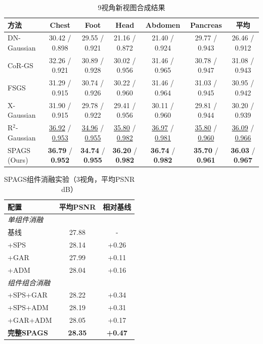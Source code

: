 \begin{table}[htbp]
    \centering
    \caption{9视角新视图合成结果}
    \label{tab:spags_9view}
    \footnotesize
    \begin{tabular*}{\textwidth}{@{\extracolsep{\fill}}lcccccc@{}}
        \toprule
        方法 & Chest & Foot & Head & Abdomen & Pancreas & 平均 \\
        \midrule
        DN-Gaussian & 30.42 / 0.898 & 29.55 / 0.921 & 21.16 / 0.872 & 21.40 / 0.924 & 29.77 / 0.943 & 26.46 / 0.912 \\
        CoR-GS & 32.26 / 0.921 & 30.89 / 0.928 & 30.02 / 0.956 & 31.46 / 0.965 & 30.78 / 0.947 & 31.08 / 0.943 \\
        FSGS & 31.29 / 0.915 & 30.74 / 0.926 & 30.22 / 0.960 & 31.46 / 0.964 & 31.03 / 0.945 & 30.95 / 0.942 \\
        X-Gaussian & 31.90 / 0.915 & 29.78 / 0.922 & 29.41 / 0.956 & 30.11 / 0.960 & 29.81 / 0.944 & 30.20 / 0.939 \\
        R$^2$-Gaussian & \underline{36.92} / \underline{0.953} & \underline{34.96} / \underline{0.955} & \underline{35.80} / \underline{0.982} & \underline{36.97} / \underline{0.981} & \underline{35.80} / \underline{0.960} & \underline{36.09} / \underline{0.966} \\
        SPAGS (Ours) & \textbf{36.79} / \textbf{0.952} & \textbf{34.74} / \textbf{0.955} & \textbf{36.20} / \textbf{0.982} & \textbf{36.74} / \textbf{0.982} & \textbf{35.70} / \textbf{0.961} & \textbf{36.03} / \textbf{0.967} \\
        \bottomrule
    \end{tabular*}
\end{table}

\begin{table}[htbp]
    \centering
    \caption{SPAGS组件消融实验（3视角，平均PSNR dB）}
    \label{tab:spags_ablation}
    \begin{tabular}{lcc}
        \toprule
        配置 & 平均PSNR & 相对基线 \\
        \midrule
        \multicolumn{3}{l}{\textit{单组件消融}} \\
        基线 & 27.88 & - \\
        +SPS & 28.14 & +0.26 \\
        +GAR & 27.99 & +0.11 \\
        +ADM & 28.04 & +0.16 \\
        \midrule
        \multicolumn{3}{l}{\textit{组件组合消融}} \\
        +SPS+GAR & 28.22 & +0.34 \\
        +SPS+ADM & 28.19 & +0.31 \\
        +GAR+ADM & 28.05 & +0.17 \\
        \textbf{完整SPAGS} & \textbf{28.35} & \textbf{+0.47} \\
        \bottomrule
    \end{tabular}
\end{table}

